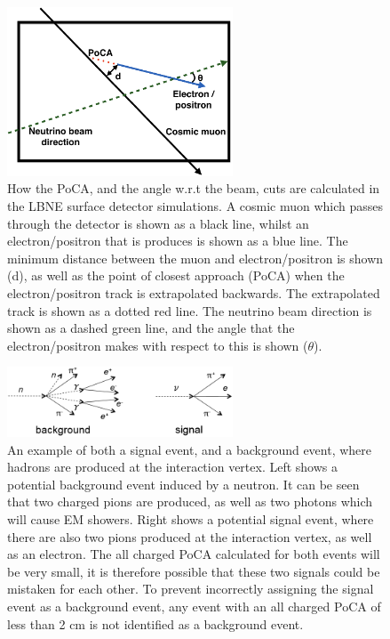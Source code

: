 \begin{figure}
  \centering
  \includegraphics[width=0.6\textwidth]{PoCA_Beam_Cuts}
  \caption[How the PoCA, and the angle w.r.t the beam, cuts are calculated in the LBNE surface detector simulations]
          {How the PoCA, and the angle w.r.t the beam, cuts are calculated in the LBNE surface detector simulations. A cosmic muon which passes through the detector is shown as a black line, whilst an electron/positron that is produces is shown as a blue line. The minimum distance between the muon and electron/positron is shown (d), as well as the point of closest approach (PoCA) when the electron/positron track is extrapolated backwards. The extrapolated track is shown as a dotted red line. The neutrino beam direction is shown as a dashed green line, and the angle that the electron/positron makes with respect to this is shown ($\theta$).}
  \label{fig:SurfPoCACut}
\end{figure}

\begin{figure}
  \centering
  \includegraphics[width=0.6\textwidth]{signal_PoCA}
  \caption[An example of both a signal event, and a background event, where hadrons are produced at the interaction vertex]
          {An example of both a signal event, and a background event, where hadrons are produced at the interaction vertex. Left shows a potential background event induced by a neutron. It can be seen that two charged pions are produced, as well as two photons which will cause EM showers. Right shows a potential signal event, where there are also two pions produced at the interaction vertex, as well as an electron. The all charged PoCA calculated for both events will be very small, it is therefore possible that these two signals could be mistaken for each other. To prevent incorrectly assigning the signal event as a background event, any event with an all charged PoCA of less than 2 cm is not identified as a background event.}
  \label{fig:SurfSigBack}
\end{figure}

